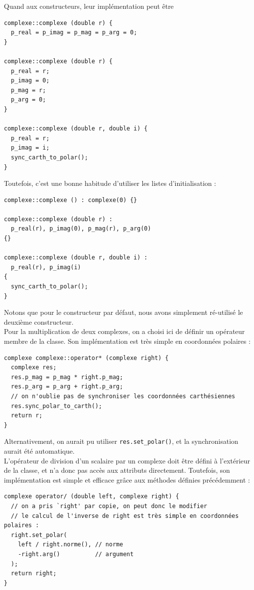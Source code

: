 \documentclass{book}
\newcommand{\inline}[1]{\texttt{#1}}
\begin{document}
\begin{correction}
Quand aux constructeurs, leur implémentation peut être
\begin{verbatim}
complexe::complexe (double r) {
  p_real = p_imag = p_mag = p_arg = 0;
}

complexe::complexe (double r) {
  p_real = r;
  p_imag = 0;
  p_mag = r;
  p_arg = 0;
}

complexe::complexe (double r, double i) {
  p_real = r;
  p_imag = i;
  sync_carth_to_polar();
}
\end{verbatim}

Toutefois, c'est une bonne habitude d'utiliser les listes d'initialisation :

\begin{verbatim}
complexe::complexe () : complexe(0) {}

complexe::complexe (double r) :
  p_real(r), p_imag(0), p_mag(r), p_arg(0)
{}

complexe::complexe (double r, double i) :
  p_real(r), p_imag(i)
{
  sync_carth_to_polar();
}
\end{verbatim}

Notons que pour le constructeur par défaut, nous avons simplement ré-utilisé le deuxième constructeur.\\

Pour la multiplication de deux complexes, on a choisi ici de définir un opérateur membre de la classe. Son implémentation est très simple en coordonnées polaires :
\begin{verbatim}
complexe complexe::operator* (complexe right) {
  complexe res;
  res.p_mag = p_mag * right.p_mag;
  res.p_arg = p_arg + right.p_arg;
  // on n'oublie pas de synchroniser les coordonnées carthésiennes
  res.sync_polar_to_carth();
  return r;
}
\end{verbatim}

Alternativement, on aurait pu utiliser \inline{res.set_polar()}, et la synchronisation aurait été automatique.\\

L'opérateur de division d'un scalaire par un complexe doit être défini à l'extérieur de la classe, et n'a donc pas accès aux attributs directement. Toutefois, son implémentation est simple et efficace grâce aux méthodes définies précédemment :

\begin{verbatim}
complexe operator/ (double left, complexe right) {
  // on a pris `right' par copie, on peut donc le modifier
  // le calcul de l'inverse de right est très simple en coordonnées polaires :
  right.set_polar(
    left / right.norme(), // norme
    -right.arg()          // argument
  );
  return right;
}
\end{verbatim}


\end{correction}
\end{document}

